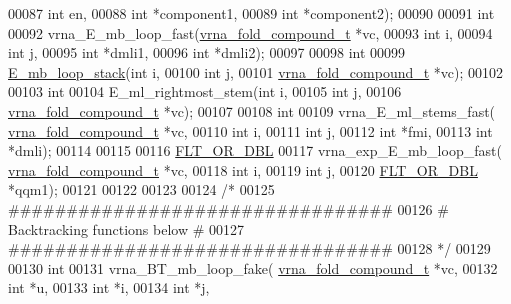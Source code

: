 \begin{DoxyCode}
00087                 \textcolor{keywordtype}{int} en,
00088                 \textcolor{keywordtype}{int} *component1,
00089                 \textcolor{keywordtype}{int} *component2);
00090 
00091 \textcolor{keywordtype}{int}
00092 vrna\_E\_mb\_loop\_fast(\hyperlink{group__fold__compound_structvrna__fc__s}{vrna\_fold\_compound\_t} *vc,
00093                     \textcolor{keywordtype}{int} i,
00094                     \textcolor{keywordtype}{int} j,
00095                     \textcolor{keywordtype}{int} *dmli1,
00096                     \textcolor{keywordtype}{int} *dmli2);
00097 
00098 \textcolor{keywordtype}{int}
00099 \hyperlink{group__loops_ga81d73d23f480f84df8cfd0042c032503}{E\_mb\_loop\_stack}(\textcolor{keywordtype}{int} i,
00100                 \textcolor{keywordtype}{int} j,
00101                 \hyperlink{group__fold__compound_structvrna__fc__s}{vrna\_fold\_compound\_t} *vc);
00102 
00103 \textcolor{keywordtype}{int}
00104 E\_ml\_rightmost\_stem(\textcolor{keywordtype}{int} i,
00105                     \textcolor{keywordtype}{int} j,
00106                     \hyperlink{group__fold__compound_structvrna__fc__s}{vrna\_fold\_compound\_t} *vc);
00107 
00108 \textcolor{keywordtype}{int}
00109 vrna\_E\_ml\_stems\_fast( \hyperlink{group__fold__compound_structvrna__fc__s}{vrna\_fold\_compound\_t} *vc,
00110                       \textcolor{keywordtype}{int} i,
00111                       \textcolor{keywordtype}{int} j,
00112                       \textcolor{keywordtype}{int} *fmi,
00113                       \textcolor{keywordtype}{int} *dmli);
00114 
00115 
00116 \hyperlink{group__data__structures_ga31125aeace516926bf7f251f759b6126}{FLT\_OR\_DBL}
00117 vrna\_exp\_E\_mb\_loop\_fast( \hyperlink{group__fold__compound_structvrna__fc__s}{vrna\_fold\_compound\_t} *vc,
00118                     \textcolor{keywordtype}{int} i,
00119                     \textcolor{keywordtype}{int} j,
00120                     \hyperlink{group__data__structures_ga31125aeace516926bf7f251f759b6126}{FLT\_OR\_DBL} *qqm1);
00121 
00122 
00123 
00124 \textcolor{comment}{/*}
00125 \textcolor{comment}{#################################}
00126 \textcolor{comment}{# Backtracking functions below  #}
00127 \textcolor{comment}{#################################}
00128 \textcolor{comment}{*/}
00129 
00130 \textcolor{keywordtype}{int}
00131 vrna\_BT\_mb\_loop\_fake( \hyperlink{group__fold__compound_structvrna__fc__s}{vrna\_fold\_compound\_t} *vc,
00132                       \textcolor{keywordtype}{int} *u,
00133                       \textcolor{keywordtype}{int} *i,
00134                       \textcolor{keywordtype}{int} *j,

\end{DoxyCode}
